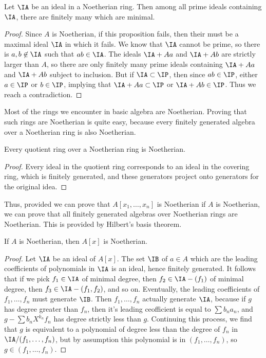 \begin{theorem}
    Let $\IA$ be an ideal in a Noetherian ring. Then among all prime ideals containing $\IA$, there are finitely many which are minimal.
\end{theorem}
\begin{proof}
    Since $A$ is Noetherian, if this proposition fails, then their must be a maximal ideal $\IA$ in which it fails. We know that $\IA$ cannot be prime, so there is $a,b \not \in \IA$ such that $ab \in \IA$. The ideals $\IA + Aa$ and $\IA + Ab$ are strictly larger than $A$, so there are only finitely many prime ideals containing $\IA + Aa$ and $\IA + Ab$ subject to inclusion. But if $\IA \subset \IP$, then since $ab \in \IP$, either $a \in \IP$ or $b \in \IP$, implying that $\IA + Aa \subset \IP$ or $\IA + Ab \in \IP$. Thus we reach a contradiction.
\end{proof}

Most of the rings we encounter in basic algebra are Noetherian. Proving that such rings are Noetherian is quite easy, because every finitely generated algebra over a Noetherian ring is also Noetherian.

\begin{lemma}
    Every quotient ring over a Noetherian ring is Noetherian.
\end{lemma}
\begin{proof}
    Every ideal in the quotient ring corresponds to an ideal in the covering ring, which is finitely generated, and these generators project onto generators for the original idea.
\end{proof}

Thus, provided we can prove that $A[x_1, \dots, x_n]$ is Noetherian if $A$ is Noetherian, we can prove that all finitely generated algebras over Noetherian rings are Noetherian. This is provided by Hilbert's basis theorem.

\begin{theorem}
    If $A$ is Noetherian, then $A[x]$ is Noetherian.
\end{theorem}
\begin{proof}
    Let $\IA$ be an ideal of $A[x]$. The set $\IB$ of $a \in A$ which are the leading coefficients of polynomials in $\IA$ is an ideal, hence finitely generated. It follows that if we pick $f_1 \in \IA$ of minimal degree, then $f_2 \in \IA - (f_1)$ of minimal degree, then $f_3 \in \IA - (f_1, f_2)$, and so on. Eventually, the leading coefficients of $f_1, \dots, f_n$ must generate $\IB$. Then $f_1, \dots, f_n$ actually generate $\IA$, because if $g$ has degree greater than $f_n$, then it's leading ceofficient is equal to $\sum b_n a_n$, and $g - \sum b_n X^{k_n} f_n$ has degree strictly less than $g$. Continuing this process, we find that $g$ is equivalent to a polynomial of degree less than the degree of $f_n$ in $\IA/(f_1, \dots, f_n)$, but by assumption this polynomial is in $(f_1, \dots, f_n)$, so $g \in (f_1, \dots, f_n)$.
\end{proof}

